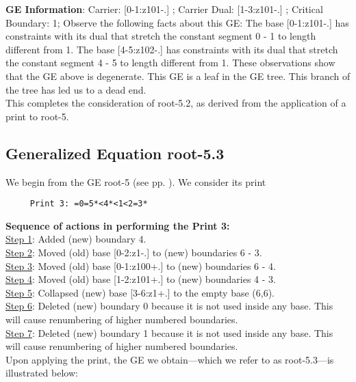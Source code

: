 \documentclass[final]{article}
\begin{document}
{\bf GE Information}:  
Carrier: [0-1:z101-.] ;  
Carrier Dual: [1-3:z101-.] ;  
Critical Boundary: 1;  
Observe the following facts about this GE:
The base [0-1:z101-.]  has constraints with its dual that stretch the constant segment 0 - 1 to length different from 1.  The base [4-5:z102-.]  has constraints with its dual that stretch the constant segment 4 - 5 to length different from 1.  These observations show that the GE above is degenerate.  This GE is a leaf in the GE tree.  This branch of the tree has led us to a dead end.\\[0.1in]
This completes the consideration of root-5.2, as derived from the application of a print to root-5.\\[0.1in]
\subsection*{Generalized Equation root-5.3}
\label{root-5.3}We begin from the GE root-5 (see pp. \pageref{root-5}).  {We consider its print}
\begin{verbatim}
     Print 3: =0=5*<4*<1<2=3*
\end{verbatim}
{\bf Sequence of actions in performing the Print 3:}\\
{\underline{Step 1}:} Added (new) boundary 4.\\
{\underline{Step 2}:} Moved (old) base [0-2:z1-.]  to (new) boundaries 6 - 3.\\
{\underline{Step 3}:} Moved (old) base [0-1:z100+.]  to (new) boundaries 6 - 4.\\
{\underline{Step 4}:} Moved (old) base [1-2:z101+.]  to (new) boundaries 4 - 3.\\
{\underline{Step 5}:} Collapsed (new) base [3-6:z1+.]  to the empty base (6,6).
\\
{\underline{Step 6}:} Deleted (new) boundary 0 because it is not used inside any base.  This will cause renumbering of higher numbered boundaries.
\\
{\underline{Step 7}:} Deleted (new) boundary 1 because it is not used inside any base.  This will cause renumbering of higher numbered boundaries.
\\[0.1in]
{Upon applying the print, the GE we obtain---which we refer to as root-5.3---is illustrated below:}
\end{document}
